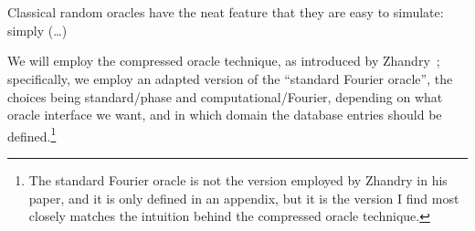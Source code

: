 \section{\titleCompressed}\label{sec:compressed}
  Classical random oracles have the neat feature that they are easy to
  simulate: simply (\ldots)
  
  We will employ the compressed oracle technique, as introduced by
    Zhandry~\cite{C:Zhandry19};
    specifically, we employ an adapted version of the ``standard Fourier
    oracle'', the choices
    being standard/phase and computational/Fourier, depending on what
    oracle interface we want, and in which domain the database entries should
    be defined.\footnote{
      The standard Fourier oracle is not the version
      employed by Zhandry in his paper, and it is only defined in an appendix,
      but it is the version I find most closely
      matches the intuition behind the compressed oracle technique.
    }

